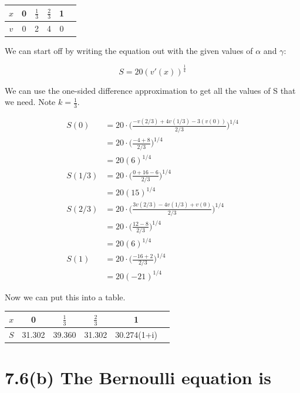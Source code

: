 \documentclass{article}
\begin{document}
\begin{table}[h!]
  \centering
  \begin{tabular} {c | c c c c c }
    $x$ & 0 & $\frac{1}{3}$ & $\frac{2}{3}$ & 1 \\ 
    \hline  
    $v$ & 0 & 2 & 4 & 0 \\
  \end{tabular}
\end{table}

We can start off by writing the equation out with the given values of $\alpha$ and $\gamma$:

$$S = 20(v'(x))^{\frac{1}{4}}$$

We can use the one-sided difference approximation to get all the values of S that we need. Note $k = \frac{1}{3}$.

\begin{align*}
  S(0) &= 20\cdot\Big(\frac{-v(2/3) + 4v(1/3) - 3(v(0))}{2/3}\Big)^{1/4} \\
  &= 20 \cdot \Big(\frac{-4 + 8}{2/3}\Big)^{1/4} \\
  &= 20(6)^{1/4} \\
  S(1/3) &= 20\cdot\Big(\frac{0 + 16 - 6}{2/3}\Big)^{1/4} \\
  &= 20(15)^{1/4} \\
  S(2/3) &= 20\cdot\Big(\frac{3v(2/3) - 4v(1/3) + v(0)}{2/3}\Big)^{1/4} \\
  &= 20 \cdot \Big(\frac{12 - 8}{2/3}\Big)^{1/4} \\
  &= 20(6)^{1/4} \\
  S(1) &= 20\cdot\Big(\frac{-16 + 2}{2/3}\Big)^{1/4} \\
  &= 20(-21)^{1/4}
\end{align*}

Now we can put this into a table.

\begin{table}[h!]
  \centering
  \begin{tabular} {c | c c c c c }
    $x$ & 0 & $\frac{1}{3}$ & $\frac{2}{3}$ & 1 \\ 
    \hline  
    $S$ & 31.302 & 39.360 & 31.302 & 30.274(1+i) \\
  \end{tabular}
\end{table}



\section*{7.6(b)  \normalsize The Bernoulli equation is}
\end{document}
